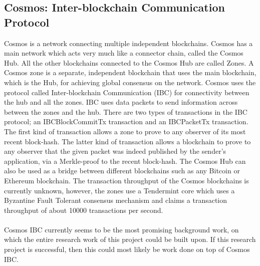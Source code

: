 \documentclass[a4paper,twoside,phd]{BYUPhys}
\begin{document}
\subsection{Cosmos: Inter-blockchain Communication Protocol}
Cosmos is a network connecting multiple independent blockchains. Cosmos has a main network which acts very much like a connector chain, called the Cosmos Hub. All the other blockchains connected to the Cosmos Hub are called Zones. A Cosmos zone is a separate, independent blockchain that uses the main blockchain, which is the Hub, for achieving global consensus on the network. Cosmos uses the protocol called Inter-blockchain Communication (IBC) for connectivity between the hub and all the zones. IBC uses data packets to send information across between the zones and the hub. There are two types of transactions in the IBC protocol; an IBCBlockCommitTx transaction and an IBCPacketTx transaction. The first kind of transaction allows a zone to prove to any observer of its most recent block-hash. The latter kind of transaction allows a blockchain to prove to any observer that the given packet was indeed published by the sender's application, via a Merkle-proof to the recent block-hash. The Cosmos Hub can also be used as a bridge between different blockchains such as any Bitcoin or Ethereum blockchain. The transaction throughput of the Cosmos blockchains is currently unknown, however, the zones use a Tendermint core which uses a Byzantine Fault Tolerant consensus mechanism and claims a transaction throughput of about 10000 transactions per second. \cite{Kwon2018ALedgers}
\\
\\
Cosmos IBC currently seems to be the most promising background work, on which the entire research work of this project could be built upon. If this research project is successful, then this could most likely be work done on top of Cosmos IBC.
\end{document}
